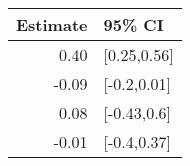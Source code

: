 \begin{tabular}{rl}
  \hline
Estimate & 95\% CI \\ 
  \hline
0.40 & [0.25,0.56] \\ 
  -0.09 & [-0.2,0.01] \\ 
  0.08 & [-0.43,0.6] \\ 
  -0.01 & [-0.4,0.37] \\ 
   \hline
\end{tabular}

